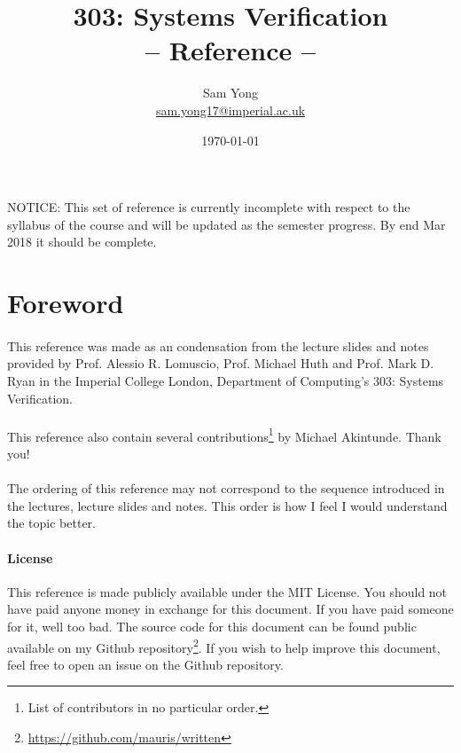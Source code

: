 \documentclass{article}
\title{
	 \huge 303: Systems Verification\\
	 \huge -- Reference --
}
\date{\today}
\author{
	Sam Yong \\
	\small \href{mailto:sam.yong17@imperial.ac.uk}{sam.yong17@imperial.ac.uk}
}
\theoremstyle{plain}
\theoremstyle{definition}
\begin{document}
\maketitle

\begin{multicols}{2}

\paragraph{} NOTICE: This set of reference is currently incomplete with respect to the syllabus of the course and will be updated as the semester progress. By end Mar 2018 it should be complete.

\section*{Foreword}  

\paragraph{} This reference was made as an condensation from the lecture slides and notes provided by Prof. Alessio R. Lomuscio, Prof. Michael Huth and Prof. Mark D. Ryan in the Imperial College London, Department of Computing's 303: Systems Verification.

\paragraph{} This reference also contain several contributions\footnote{List of contributors in no particular order.} by Michael Akintunde. Thank you!

\paragraph{} The ordering of this reference may not correspond to the sequence introduced in the lectures, lecture slides and notes. This order is how I feel I would understand the topic better.

\begin{footnotesize}
\paragraph{License} This reference is made publicly available under the MIT License. You should not have paid anyone money in exchange for this document. If you have paid someone for it, well too bad. The source code for this document can be found public available on my Github repository\footnote{\href{https://github.com/mauris/written}{https://github.com/mauris/written}}. If you wish to help improve this document, feel free to open an issue on the Github repository.
\end{footnotesize}
\newpage


\end{multicols}
\end{document}
